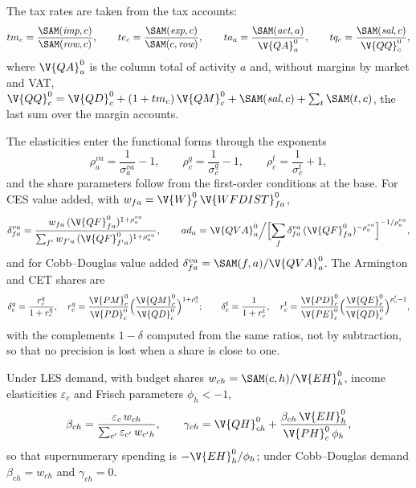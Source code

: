 The tax rates are taken from the tax accounts:
\begin{equation*}
tm_c = \frac{\SAM(\textit{imp}, c)}{\SAM(\textit{row}, c)}, \qquad
te_c = \frac{\SAM(\textit{exp}, c)}{\SAM(c, \textit{row})}, \qquad
ta_a = \frac{\SAM(\textit{act}, a)}{\V{QA}^0_a}, \qquad
tq_c = \frac{\SAM(\textit{sal}, c)}{\V{QQ}^0_c},
\end{equation*}
where $\V{QA}^0_a$ is the column total of activity $a$ and, without margins by
market and VAT,
$\V{QQ}^0_c = \V{QD}^0_c + (1 + tm_c)\,\V{QM}^0_c + \SAM(\textit{sal}, c) +
\sum_{t} \SAM(t, c)$, the last sum over the margin accounts.

The elasticities enter the functional forms through the exponents
\begin{equation*}
\rho^{va}_a = \frac{1}{\sigma^{va}_a} - 1, \qquad
\rho^{q}_c = \frac{1}{\sigma^{q}_c} - 1, \qquad
\rho^{t}_c = \frac{1}{\sigma^{t}_c} + 1,
\end{equation*}
and the share parameters follow from the first-order conditions at the base.
For CES value added, with $w_{fa} = \V{W}^0_f\,\V{WFDIST}^0_{fa}$,
\begin{equation*}
\delta^{va}_{fa} = \frac{w_{fa}\,(\V{QF}^0_{fa})^{1+\rho^{va}_a}}
  {\sum_{f'} w_{f'a}\,(\V{QF}^0_{f'a})^{1+\rho^{va}_a}}, \qquad
ad_a = \V{QVA}^0_a \Big/ \Bigl[\sum_f \delta^{va}_{fa}\,(\V{QF}^0_{fa})^{-\rho^{va}_a}\Bigr]^{-1/\rho^{va}_a},
\end{equation*}
and for Cobb--Douglas value added $\delta^{va}_{fa} = \SAM(f, a)/\V{QVA}^0_a$.
The Armington and CET shares are
\begin{equation*}
\delta^{q}_c = \frac{r^q_c}{1 + r^q_c}, \quad
r^q_c = \frac{\V{PM}^0_c}{\V{PD}^0_c}\Bigl(\frac{\V{QM}^0_c}{\V{QD}^0_c}\Bigr)^{1+\rho^{q}_c};
\qquad
\delta^{t}_c = \frac{1}{1 + r^t_c}, \quad
r^t_c = \frac{\V{PD}^0_c}{\V{PE}^0_c}\Bigl(\frac{\V{QE}^0_c}{\V{QD}^0_c}\Bigr)^{\rho^{t}_c - 1},
\end{equation*}
with the complements $1 - \delta$ computed from the same ratios, not by
subtraction, so that no precision is lost when a share is close to one.

Under LES demand, with budget shares $w_{ch} = \SAM(c, h)/\V{EH}^0_h$, income
elasticities $\varepsilon_c$ and Frisch parameters $\phi_h < -1$,
\begin{equation*}
\beta_{ch} = \frac{\varepsilon_c\,w_{ch}}{\sum_{c'} \varepsilon_{c'}\,w_{c'h}}, \qquad
\gamma_{ch} = \V{QH}^0_{ch} + \frac{\beta_{ch}\,\V{EH}^0_h}{\V{PH}^0_c\,\phi_h},
\end{equation*}
so that supernumerary spending is $-\V{EH}^0_h/\phi_h$; under Cobb--Douglas
demand $\beta_{ch} = w_{ch}$ and $\gamma_{ch} = 0$.

